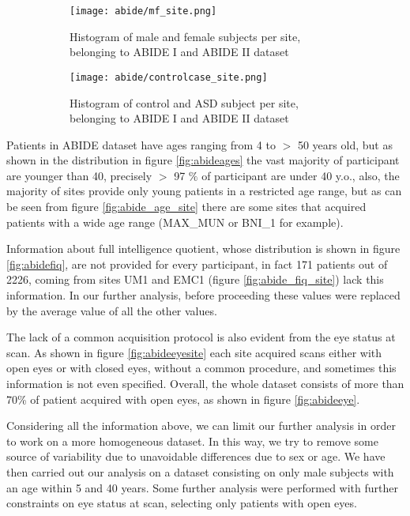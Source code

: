 \documentclass[11pt]{report}
\begin{document}
\begin{figure}[h]
\centering
\begin{subfigure}{0.9\textwidth}
\texttt{[image: abide/mf\_site.png]}
\caption{Histogram of male and female subjects per site, belonging to ABIDE I and ABIDE II dataset}
\label{fig:mf_site}
\end{subfigure}
\begin{subfigure}{0.9\textwidth}
\texttt{[image: abide/controlcase\_site.png]}
\caption{Histogram of control and ASD subject per site, belonging to ABIDE I and ABIDE II dataset}
\label{fig:controlcase_site}
\end{subfigure}
\caption{}
 
\end{figure}


Patients in ABIDE dataset have ages ranging from 4 to $>$ 50 years old, but as shown in the distribution in figure \ref{fig:abideages} the vast majority of participant are younger than 40, precisely $>$ 97 $\%$ of participant are under 40 y.o., also, the majority of sites provide only young patients in a restricted age range, but  as can be seen from figure \ref{fig:abide_age_site} there are some sites that acquired patients with a wide age range (MAX\_MUN or BNI\_1 for example).


Information about full intelligence quotient, whose distribution is shown in figure \ref{fig:abidefiq}, are not provided for every participant, in fact 171 patients out of 2226, coming from sites UM1 and EMC1 (figure \ref{fig:abide_fiq_site}) lack this information.
In our further analysis, before proceeding these values were replaced by the average value of all the other values.

The lack of a common acquisition protocol is also evident from the eye status at scan.
As shown in figure \ref{fig:abideeyesite} each site acquired scans either with open eyes or with closed eyes, without a common procedure, and sometimes this information is not even specified.
Overall, the whole dataset consists of more than 70\% of patient acquired with open eyes, as shown in figure \ref{fig:abideeye}.

Considering all the information above, we can limit our further analysis in order to work on a more homogeneous dataset. In this way, we try to remove some source of variability due to unavoidable differences due to sex or age.
We have then carried out our analysis on a dataset consisting on only male subjects with an age within 5 and 40 years. Some further analysis were performed with further constraints on eye status at scan, selecting only patients with open eyes.
\end{document}
